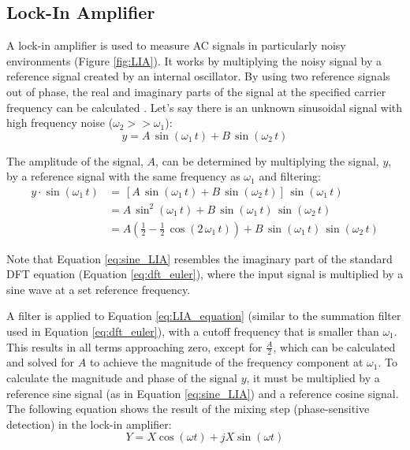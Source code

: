 \subsection{Lock-In Amplifier}

A lock-in amplifier is used to measure AC signals in particularly noisy environments (Figure \ref{fig:LIA}).  It works by multiplying the noisy signal by a reference signal created by an internal oscillator.  By using two reference signals out of phase, the real and imaginary parts of the signal at the specified carrier frequency can be calculated \cite{LIA_applications}.  Let's say there is an unknown sinusoidal signal with high frequency noise ($\omega_2 >> \omega_1$):
\begin{equation}
	y = A \,\sin{(\omega_1 \, t)} + B\,\sin{(\omega_2 \, t)}
\end{equation}

The amplitude of the signal, $A$, can be determined by multiplying the signal, $y$, by a reference signal with the same frequency as $\omega_1$ and filtering:
\begin{align}
	y \cdot \sin{(\omega_1 \, t)} &= \, \left[A \,\sin{(\omega_1 \, t)} + B\,\sin{(\omega_2 \, t)}\right] \, \sin{(\omega_1\,t)} \label{eq:sine_LIA}\\
	&=A\,\sin^2{(\omega_1\,t)} + B\,\sin{(\omega_1\,t)}\,\sin{(\omega_2\,t)} \\
	&=A\left(\frac{1}{2} - \frac{1}{2}\,\cos{(2\,\omega_1\,t)}\right) + B\,\sin{(\omega_1\,t)}\,\sin{(\omega_2\,t)} \label{eq:LIA_equation}
\end{align}

Note that Equation \ref{eq:sine_LIA} resembles the imaginary part of the standard DFT equation (Equation \ref{eq:dft_euler}), where the input signal is multiplied by a sine wave at a set reference frequency.

A filter is applied to Equation \ref{eq:LIA_equation} (similar to the summation filter used in Equation \ref{eq:dft_euler}), with a cutoff frequency that is smaller than $\omega_1$.  This results in all terms approaching zero, except for $\frac{A}{2}$, which can be calculated and solved for $A$ to achieve the magnitude of the frequency component at $\omega_1$.  To calculate the magnitude and phase of the signal $y$, it must be multiplied by a reference sine signal (as in Equation \ref{eq:sine_LIA}) and a reference cosine signal.  The following equation shows the result of the mixing step (phase-sensitive detection) in the lock-in amplifier:
\begin{equation} \label{eq:LIA_mixing}
	Y = X \cos{(\omega t)} + j X \sin{(\omega t)}
\end{equation}

